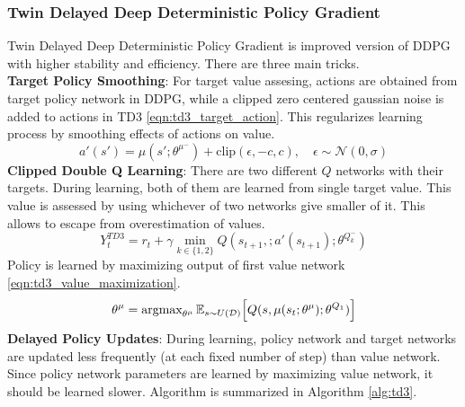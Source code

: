 \subsubsection{Twin Delayed Deep Deterministic Policy Gradient}
Twin Delayed Deep Deterministic Policy Gradient \cite{fujimoto_addressing_2018} is improved version of DDPG with higher stability and efficiency. There are three main tricks. \\
\textbf{Target Policy Smoothing}: For target value assesing, actions are obtained from target policy network in DDPG, while a clipped zero centered gaussian noise is added to actions in TD3  \eqref{eqn:td3_target_action}. This regularizes learning process by smoothing effects of actions on value. \\
\begin{equation}
\label{eqn:td3_target_action}
a'(s') = \mu(s';\theta^{\mu^-}) + \text{clip}(\epsilon, -c, c), \quad \epsilon \sim \mathcal{N}(0, \sigma)
\end{equation}
\textbf{Clipped Double Q Learning}: There are two different $Q$ networks with their targets. During learning, both of them are learned from single target value. This value is assessed by using whichever of two networks give smaller of it. This allows to escape from overestimation of values. \\
\begin{equation}
\label{eqn:td3_target}
Y_t^{TD3} = r_t + \gamma \min_{k\in\{1,2\}} Q(s_{t+1}, ;a'(s_{t+1});\theta^{Q_k^-})
\end{equation}
Policy is learned by maximizing output of first value network \eqref{eqn:td3_value_maximization}. \\
\begin{equation}
\label{eqn:td3_value_maximization}
\theta^\mu = \operatorname{\textup{argmax}}_{\theta^\mu} \mathbb{E}_{s \sim U(\mathcal{D})} \Big[ Q(s, \mu(s_t;\theta^\mu);\theta^{Q_1}) \Big]
\end{equation}
\textbf{Delayed Policy Updates}: During learning, policy network and target networks are updated less frequently (at each fixed number of step) than value network. Since policy network parameters are learned by maximizing value network, it should be learned slower. Algorithm is summarized in Algorithm \ref{alg:td3}. \\
